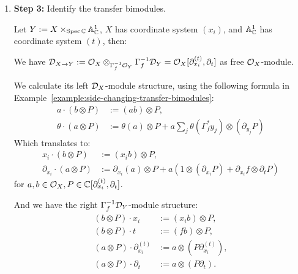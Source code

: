 \begin{example}
\begin{enumerate}
              In summary, we have
              \begin{align*}
                  \partial_u           & = \partial_t,                                           \\
                  \partial_{x_i}^{(u)} & = \partial_{x_i}^{(t)} + (\partial_{x_i} f) \partial_t.
              \end{align*}


        \item \textbf{Step 3:} Identify the transfer bimodules.

              Let $Y := X\times_{\operatorname{Spec}\mathbb{C}}\mathbb{A}^1_{\mathbb{C}}$,
              $X$ has coordinate system $(x_i)$,
              and $\mathbb{A}^1_{\mathbb{C}}$ has coordinate system $(t)$,
              then:

              We have $\mathcal{D}_{X\to Y} := \mathcal{O}_X \otimes_{\Gamma_f^{-1}\mathcal{O}_Y} \Gamma_f^{-1}\mathcal{D}_Y = \mathcal{O}_X[\partial^{(t)}_{x_i}, \partial_t]$ as free $\mathcal{O}_X$-module.

              We calculate its left $\mathcal{D}_X$-module structure, using the following formula in Example~\ref{example:side-changing-transfer-bimodules}:
              \begin{align*}
                  a \cdot (b \otimes P)      & := (ab) \otimes P,                                                                  \\
                  \theta \cdot (a \otimes P) & := \theta(a) \otimes P + a \sum_j \theta(\Gamma_f^* y_j) \otimes (\partial_{y_j} P)
              \end{align*}
              Which translates to:
              \begin{align*}
                  x_i \cdot (b \otimes P)            & := (x_i b) \otimes P,                                                                                  \\
                  \partial_{x_i} \cdot (a \otimes P) & := \partial_{x_i}(a) \otimes P + a (1\otimes (\partial_{x_i} P) + \partial_{x_i}f\otimes \partial_t P)
              \end{align*}
              for $a,b\in\mathcal{O}_X, P\in\mathbb{C}[\partial^{(t)}_{x_i}, \partial_t]$.

              And we have the right $\Gamma_f^{-1}\mathcal{D}_Y$-module structure:
              \begin{align*}
                  (b \otimes P) \cdot x_i                  & := (x_i b) \otimes P,                  \\
                  (b \otimes P) \cdot t                    & := (f b) \otimes P,                    \\
                  (a \otimes P) \cdot \partial^{(t)}_{x_i} & := a \otimes (P \partial^{(t)}_{x_i}), \\
                  (a \otimes P) \cdot \partial_t           & := a \otimes (P \partial_t).
              \end{align*}


\end{enumerate}
\end{example}
